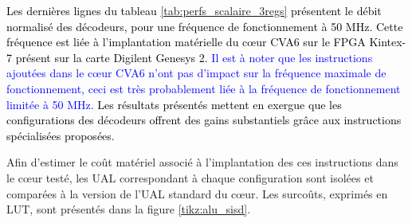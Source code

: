 \documentclass[../main.tex]{subfiles}
\begin{document}
\textcolor{black}{Les dernières lignes du tableau \ref{tab:perfs_scalaire_3regs} présentent le débit normalisé des décodeurs, pour une fréquence de fonctionnement à 50 MHz. 
Cette fréquence est liée à l'implantation matérielle du cœur CVA6 sur le FPGA Kintex-7 présent sur la carte Digilent Genesys 2.
\textcolor{blue}{Il est à noter que les instructions ajoutées dans le cœur CVA6 n'ont pas d'impact sur la fréquence maximale de fonctionnement, ceci est très probablement liée à la fréquence de fonctionnement limitée à 50 MHz.}
Les résultats présentés mettent en exergue que les configurations  des décodeurs offrent des gains substantiels grâce aux instructions spécialisées proposées.}

Afin d'estimer le coût matériel associé à l'implantation des ces instructions dans le cœur testé, les UAL correspondant à chaque configuration sont isolées et comparées à la version de l'UAL standard du cœur.
Les surcoûts, exprimés en LUT, sont présentés dans la figure \ref{tikz:alu_sisd}.
\end{document}
